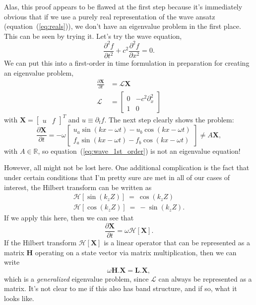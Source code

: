 \documentclass[11pt]{article}
\newcommand{\Hilbert}[1]{\mathcal{H}\!\left[#1\right]\!}
\begin{document}
Alas, this proof appears to be flawed at the first step because it's immediately obvious that if we use a purely real representation of the wave ansatz (equation~(\ref{eq:reals})), we don't have an eigenvalue problem in the first place.
This can be seen by trying it.
Let's try the wave equation,
\begin{equation}
  \label{eq:wave}
  \frac{\partial^2 f}{\partial t^2} + c^2 \frac{\partial^2 f}{\partial x^2} = 0.
\end{equation}
We can put this into a first-order in time formulation in preparation for creating an eigenvalue problem,
\begin{align}
  \label{eq:wave_1st_order}
  \frac{\partial \mathbf{X}}{\partial t} &= \mathcal{L} \mathbf{X}\\
  \mathcal{L} &= \begin{bmatrix} 0 & -c^2 \partial^2_x\\ 1 & 0 \end{bmatrix}
\end{align}
with $\mathbf{X} = \begin{bmatrix}u & f\end{bmatrix}^T$ and $u \equiv \partial_t f$.
The next step clearly shows the problem:
\begin{equation}
  \label{eq:problem}
  \frac{\partial \mathbf{X}}{\partial t} = -\omega \begin{bmatrix}
      u_a \sin{(k x - \omega t)} - u_b \cos{(k x - \omega t)}\\
      f_a \sin{(k x - \omega t)} - f_b \cos{(k x - \omega t)}
      \end{bmatrix}
      \ne A \mathbf{X},
  \end{equation}
  with $A \in \mathbb{R}$, so equation~(\ref{eq:wave_1st_order}) is not an eigenvalue equation!

  However, all might not be lost here. One additional complication is the fact that under certain conditions that I'm pretty sure are met in all of our cases of interest, the Hilbert transform can be written as
  \begin{align}
  \Hilbert{\sin(k_z Z)} \ = \   \cos (k_z Z)\\
    \Hilbert{\cos(k_z Z)} \ = \  - \sin(k_z Z).
  \end{align}
  If we apply this here, then we can see that
  \begin{equation}
    \label{eq:dt_hilbert}
    \frac{\partial \mathbf{X}}{\partial t} = \omega \Hilbert{\mathbf{X}}.    
  \end{equation}
  If the Hilbert transform $\Hilbert{\mathbf{X}}$ is a linear operator that can be represented as a matrix $\mathbf{H}$  operating on a state vector via matrix multiplication, then we can write
  \begin{equation}
    \label{eq:real_hilbert_gen_eval}
    \omega \mathbf{H}.{\mathbf{X}} = \mathbf{L}.\mathbf{X},
  \end{equation}
  which is a \emph{generalized} eigenvalue problem, since $\mathcal{L}$ can always be represented as a matrix.
It's not clear to me if this also has band structure, and if so, what it looks like.
\end{document}
